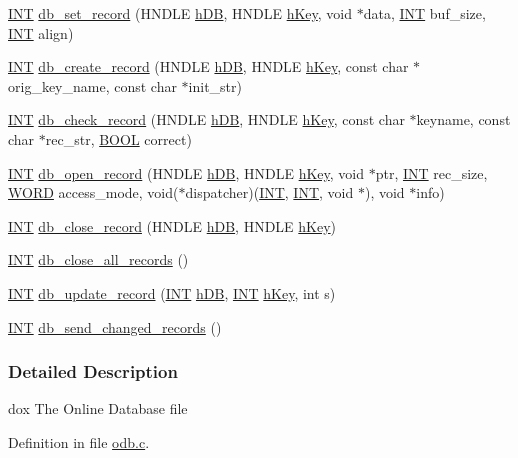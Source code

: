 \begin{DoxyCompactItemize}
\item 
\hyperlink{vppg_8h_a392e62da233ed3e2f7c3fd4f487a3896}{INT} \hyperlink{group__odbfunctionc_ga1e4bca66d45d069477c614bc2481d89f}{db\_\-set\_\-record} (HNDLE \hyperlink{mevb_8c_ab1f60c53f74e806a3b9f687af38d7421}{hDB}, HNDLE \hyperlink{mevb_8c_a8cd567d23219ba7fc83280cf20caf1c2}{hKey}, void $\ast$data, \hyperlink{vppg_8h_a392e62da233ed3e2f7c3fd4f487a3896}{INT} buf\_\-size, \hyperlink{vppg_8h_a392e62da233ed3e2f7c3fd4f487a3896}{INT} align)
\item 
\hyperlink{vppg_8h_a392e62da233ed3e2f7c3fd4f487a3896}{INT} \hyperlink{group__odbfunctionc_ga59b971e77416b2b463e2e63f1b05342b}{db\_\-create\_\-record} (HNDLE \hyperlink{mevb_8c_ab1f60c53f74e806a3b9f687af38d7421}{hDB}, HNDLE \hyperlink{mevb_8c_a8cd567d23219ba7fc83280cf20caf1c2}{hKey}, const char $\ast$orig\_\-key\_\-name, const char $\ast$init\_\-str)
\item 
\hyperlink{vppg_8h_a392e62da233ed3e2f7c3fd4f487a3896}{INT} \hyperlink{group__odbfunctionc_gad504df013bd9f61366ed48d6666985a1}{db\_\-check\_\-record} (HNDLE \hyperlink{mevb_8c_ab1f60c53f74e806a3b9f687af38d7421}{hDB}, HNDLE \hyperlink{mevb_8c_a8cd567d23219ba7fc83280cf20caf1c2}{hKey}, const char $\ast$keyname, const char $\ast$rec\_\-str, \hyperlink{vt2_8h_a239c7f0d40651c3e419c5b9651507d14}{BOOL} correct)
\item 
\hyperlink{vppg_8h_a392e62da233ed3e2f7c3fd4f487a3896}{INT} \hyperlink{group__odbfunctionc_ga852bc9fa8ee4d0884b328aeb0b0cfd63}{db\_\-open\_\-record} (HNDLE \hyperlink{mevb_8c_ab1f60c53f74e806a3b9f687af38d7421}{hDB}, HNDLE \hyperlink{mevb_8c_a8cd567d23219ba7fc83280cf20caf1c2}{hKey}, void $\ast$ptr, \hyperlink{vppg_8h_a392e62da233ed3e2f7c3fd4f487a3896}{INT} rec\_\-size, \hyperlink{vt2_8h_a2b0e863dadf920709ec53d9088ee7c91}{WORD} access\_\-mode, void($\ast$dispatcher)(\hyperlink{vppg_8h_a392e62da233ed3e2f7c3fd4f487a3896}{INT}, \hyperlink{vppg_8h_a392e62da233ed3e2f7c3fd4f487a3896}{INT}, void $\ast$), void $\ast$info)
\item 
\hyperlink{vppg_8h_a392e62da233ed3e2f7c3fd4f487a3896}{INT} \hyperlink{group__odbfunctionc_gaa621351e007f68f6298b8edf5bd652c4}{db\_\-close\_\-record} (HNDLE \hyperlink{mevb_8c_ab1f60c53f74e806a3b9f687af38d7421}{hDB}, HNDLE \hyperlink{mevb_8c_a8cd567d23219ba7fc83280cf20caf1c2}{hKey})
\item 
\hyperlink{vppg_8h_a392e62da233ed3e2f7c3fd4f487a3896}{INT} \hyperlink{group__odbfunctionc_ga8611a895b6ddf4cc6b25fed3c7473e3a}{db\_\-close\_\-all\_\-records} ()
\item 
\hyperlink{vppg_8h_a392e62da233ed3e2f7c3fd4f487a3896}{INT} \hyperlink{group__odbfunctionc_gae5f470f0c97794d8da1017f609276bc4}{db\_\-update\_\-record} (\hyperlink{vppg_8h_a392e62da233ed3e2f7c3fd4f487a3896}{INT} \hyperlink{mevb_8c_ab1f60c53f74e806a3b9f687af38d7421}{hDB}, \hyperlink{vppg_8h_a392e62da233ed3e2f7c3fd4f487a3896}{INT} \hyperlink{mevb_8c_a8cd567d23219ba7fc83280cf20caf1c2}{hKey}, int s)
\item 
\hyperlink{vppg_8h_a392e62da233ed3e2f7c3fd4f487a3896}{INT} \hyperlink{group__odbfunctionc_gae5ccb46009b64dbeff8dbc05be27664b}{db\_\-send\_\-changed\_\-records} ()
\end{DoxyCompactItemize}


\subsubsection{Detailed Description}
dox The Online Database file 

Definition in file \hyperlink{odb_8c_source}{odb.c}.